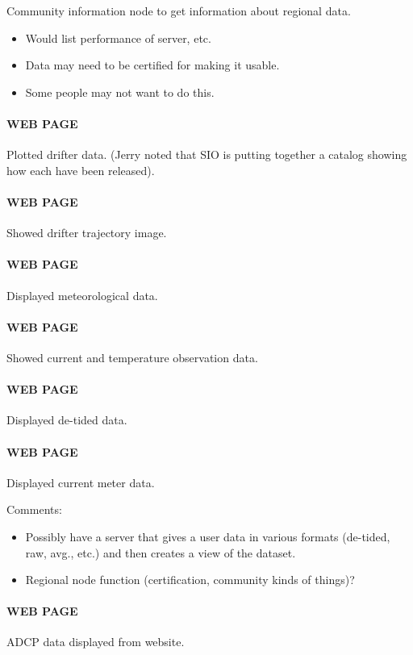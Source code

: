 Community information node to get information about regional data.
\begin{itemize}
\item Would list performance of server, etc.
\item Data may need to be certified for making it usable.
\item Some people may not want to do this.
\end{itemize}

\paragraph{WEB PAGE} Plotted drifter data. (Jerry noted that SIO is putting together a catalog 
showing how each have been released).

\paragraph{WEB PAGE}       Showed drifter trajectory image.

\paragraph{WEB PAGE}       Displayed meteorological data.

\paragraph{WEB PAGE}        Showed current and temperature observation data.

\paragraph{WEB PAGE}       Displayed de-tided data.

\paragraph{WEB PAGE}       Displayed current meter data.

Comments:
\begin{itemize}
\item Possibly have a server that gives a user data in various formats
  (de-tided, raw, avg., etc.) and then creates a view of the dataset.
\item Regional node function (certification, community kinds of
  things)?
\end{itemize}

\paragraph{WEB PAGE}       ADCP data displayed from website.

